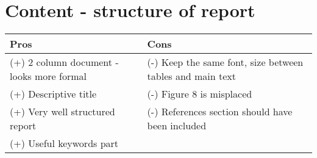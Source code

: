 \section{Content -  structure of report}

\begin{table}[H]
  \centering
    \begin{tabular}{p{7cm}|p{7cm}}
    \toprule
    \textbf{Pros}  & \textbf{Cons} \\
    \midrule
    (+) 2 column document - looks more formal & (-) Keep the same font, size between tables and main text \\
    (+) Descriptive title & (-) Figure 8 is misplaced \\
    (+) Very well structured report & (-) References section should have been included \\
    (+) Useful keywords part &  \\
    \bottomrule
    \end{tabular}%
  \label{tab:addlabel}%
\end{table}%

